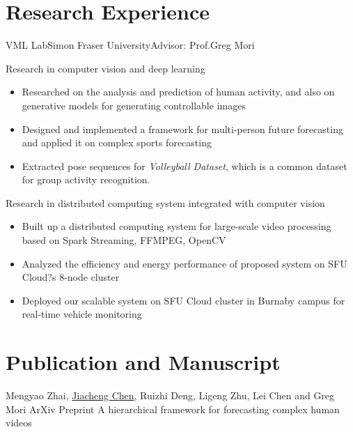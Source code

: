 \documentclass[11pt,a4paper,sans]{moderncv}   %
\begin{document}
\section{Research Experience}
{\newline VML Lab}{Simon Fraser University}{Advisor: Prof.Greg Mori}
{Research in computer vision and deep learning%
\begin{itemize}%
\item Researched on the analysis and prediction of human activity, and also on generative models for generating controllable images
\item Designed and implemented a framework for multi-person future forecasting and applied it on complex sports forecasting
\item Extracted pose sequences for \textit{Volleyball Dataset}, which is a common dataset for group activity recognition.
\end{itemize}}

{Research in distributed computing system integrated with computer vision%
\begin{itemize}%
\item Built up a distributed computing system for large-scale video processing based on Spark Streaming, FFMPEG, OpenCV
\item Analyzed the efficiency and energy performance of proposed system on SFU Cloud?s 8-node cluster
\item Deployed our scalable system on SFU Cloud cluster in Burnaby campus for real-time vehicle monitoring
\end{itemize}
}


\section{Publication and Manuscript}
{}
{\newline Mengyao Zhai, \underline{Jiacheng Chen}, Ruizhi Deng, Ligeng Zhu, Lei Chen and Greg Mori}
{\newline ArXiv Preprint}
{A hierarchical framework for forecasting complex human videos}
\end{document}
